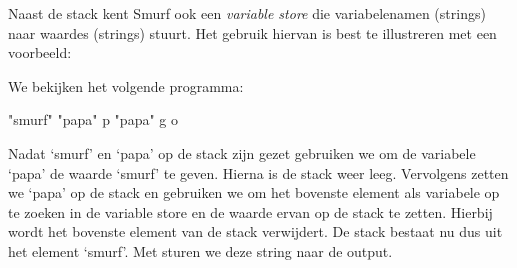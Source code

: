Naast de stack kent Smurf ook een \emph{variable store} die variabelenamen
(strings) naar waardes (strings) stuurt. Het gebruik hiervan is best te
illustreren met een voorbeeld:

\begin{exmp}
	We bekijken het volgende programma:
	\begin{smurf}"smurf" "papa" p "papa" g o\end{smurf}
	Nadat `smurf' en `papa' op de stack zijn gezet gebruiken we 
	om de variabele `papa' de waarde `smurf' te geven. Hierna is de stack weer
	leeg. Vervolgens zetten we `papa' op de stack en gebruiken we 
	om het bovenste element als variabele op te zoeken in de variable store en de
	waarde ervan op de stack te zetten. Hierbij wordt het bovenste element van de
	stack verwijdert. De stack bestaat nu dus uit het element `smurf'. Met
	 sturen we deze string naar de output.
\end{exmp}





